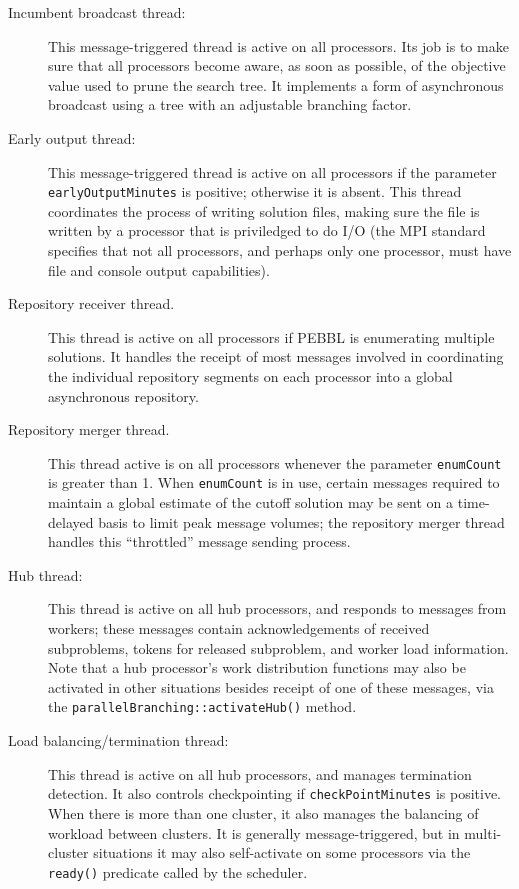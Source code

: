 \begin{description}

\item[Incumbent broadcast thread:] This message-triggered thread is
  active on all processors.  Its job is to make sure that all
  processors become aware, as soon as possible, of the objective value
  used to prune the search tree.  It implements a form of
  asynchronous broadcast using a tree with an adjustable branching
  factor.

\item[Early output thread:] This message-triggered thread is active on
  all processors if the parameter \texttt{earlyOutputMinutes} is
  positive; otherwise it is absent. This thread coordinates the
  process of writing solution files, making sure the file is written
  by a processor that is priviledged to do I/O (the MPI standard
  specifies that not all processors, and perhaps only one processor,
  must have file and console output capabilities).

\item[Repository receiver thread.]  This thread is active on all
  processors if PEBBL is enumerating multiple solutions.  It handles
  the receipt of most messages involved in coordinating the individual
  repository segments on each processor into a global asynchronous
  repository.

\item[Repository merger thread.]  This thread active is on all
  processors whenever the parameter \texttt{enumCount} is greater than
  1.  When \texttt{enumCount} is in use, certain messages required to
  maintain a global estimate of the cutoff solution may be sent on a
  time-delayed basis to limit peak message volumes; the repository
  merger thread handles this ``throttled'' message sending process.

\item[Hub thread:]  This thread is active on all hub processors, and
  responds to messages from workers; these messages contain
  acknowledgements of received subproblems, tokens for released
  subproblem, and worker load information.  Note that a hub
  processor's work distribution functions may also be activated in
  other situations besides receipt of one of these messages, via the
  \texttt{parallelBranching::activateHub()} method. 

\item[Load balancing/termination thread:] This thread is active on
  all hub processors, and manages termination detection.  It also
  controls checkpointing if \texttt{checkPointMinutes} is positive.  When
  there is more than one cluster, it also manages the balancing of
  workload between clusters.  It is generally message-triggered, but
  in multi-cluster situations it may also self-activate on some
  processors via the \texttt{ready()} predicate called by the scheduler.


\end{description}
